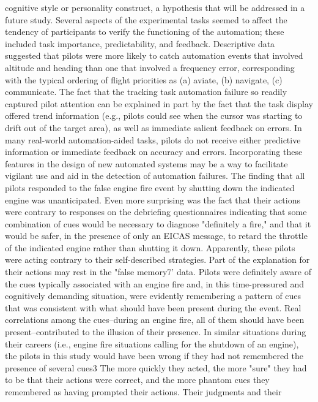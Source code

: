 \documentclass[utf8,bachelor,manualbib]{gradu3}
\begin{document}
cognitive style or personality construct, a hypothesis that will be addressed in a
future study.
Several aspects of the experimental tasks seemed to affect the tendency of
participants to verify the functioning of the automation; these included task importance,
predictability, and feedback. Descriptive data suggested that pilots were more
likely to catch automation events that involved altitude and heading than one that
involved a frequency error, corresponding with the typical ordering of flight
priorities as (a) aviate, (b) navigate, (c) communicate. The fact that the tracking
task automation failure so readily captured pilot attention can be explained in part
by the fact that the task display offered trend information (e.g., pilots could see
when the cursor was starting to drift out of the target area), as well as immediate
salient feedback on errors. In many real-world automation-aided tasks, pilots do
not receive either predictive information or immediate feedback on accuracy and
errors. Incorporating these features in the design of new automated systems may
be a way to facilitate vigilant use and aid in the detection of automation failures.
The finding that all pilots responded to the false engine fire event by shutting
down the indicated engine was unanticipated. Even more surprising was the fact
that their actions were contrary to responses on the debriefing questionnaires
indicating that some combination of cues would be necessary to diagnose "definitely
a fire," and that it would be safer, in the presence of only an EICAS message,
to retard the throttle of the indicated engine rather than shutting it down. Apparently,
these pilots were acting contrary to their self-described strategies. Part of the
explanation for their actions may rest in the "false memory7' data.
Pilots were definitely aware of the cues typically associated with an engine fire
and, in this time-pressured and cognitively demanding situation, were evidently
remembering a pattern of cues that was consistent with what should have been
present during the event. Real correlations among the cues--during an engine fire,
all of them should have been present--contributed to the illusion of their presence.
In similar situations during their careers (i.e., engine fire situations calling for the
shutdown of an engine), the pilots in this study would have been wrong if they had
not remembered the presence of several cues3 The more quickly they acted, the more "sure" they had to be that their actions were correct, and the more phantom
cues they remembered as having prompted their actions. Their judgments and their
\end{document}
